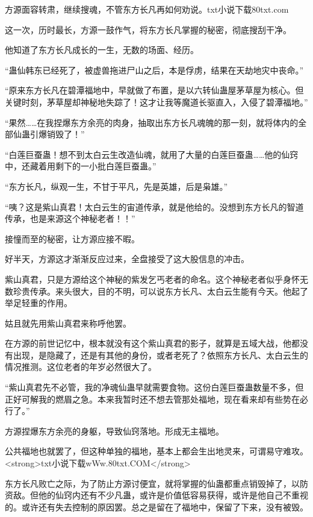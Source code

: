 
\begin{this_body}

方源面容转肃，继续搜魂，不管东方长凡再如何劝说。txt小说下载80txt.com

这一次，历时最长，方源一鼓作气，将东方长凡掌握的秘密，彻底搜刮干净。

他知道了东方长凡成长的一生，无数的场面、经历。

“蛊仙韩东已经死了，被虚兽拖进尸山之后，本是俘虏，结果在天劫地灾中丧命。”

“原来东方长凡在碧潭福地中，早就做了布置，是以六转仙蛊屋茅草屋为核心。但关键时刻，茅草屋却神秘地失踪了！这才让我等魔道长驱直入，入侵了碧潭福地。”

“果然……在我捏爆东方余亮的肉身，抽取出东方长凡魂魄的那一刻，就将体内的全部仙蛊引爆销毁了！”

“白莲巨蚕蛊！想不到太白云生改造仙魂，就用了大量的白莲巨蚕蛊……他的仙窍中，还藏着用剩下的一小批白莲巨蚕蛊。”

“东方长凡，纵观一生，不甘于平凡，先是英雄，后是枭雄。”

“咦？这是紫山真君！太白云生的宙道传承，就是他给的。没想到东方长凡的智道传承，也是来源这个神秘老者！！”

接憧而至的秘密，让方源应接不暇。

好半天，方源这才渐渐反应过来，全盘接受了这大股信息的冲击。

紫山真君，只是方源给这个神秘的紫发乞丐老者的命名。这个神秘老者似乎身怀无数珍贵传承。来头很大，目的不明，可以说东方长凡、太白云生能有今天。他起了举足轻重的作用。

姑且就先用紫山真君来称呼他罢。

在方源的前世记忆中，根本就没有这个紫山真君的影子，就算是五域大战，他都没有出现，是隐藏了，还是有其他的身份，或者老死了？依照东方长凡、太白云生的情况推测。这位老者的年岁必然很大了。

“紫山真君先不必管，我的净魂仙蛊早就需要食物。这份白莲巨蚕蛊数量不多，但正好可解我的燃眉之急。本来我暂时还不想去管那处福地，现在看来却有些势在必行了。”

方源捏爆东方余亮的身躯，导致仙窍落地。形成无主福地。

公共福地也就罢了，但这种单独的福地，基本上都会生出地灵来，可谓易守难攻。<strong>txt小说下载wWw.80txt.COM</strong>

东方长凡败亡之际，为了防止方源讨便宜，就将掌握的仙蛊都重点销毁掉了，以防资敌。但他的仙窍内还有不少凡蛊，或许是价值低容易获得，或许是他自己不重视的。或许还有失去控制的原因罢。总之是留在了福地中，保留了下来，没有被毁。


\end{this_body}
